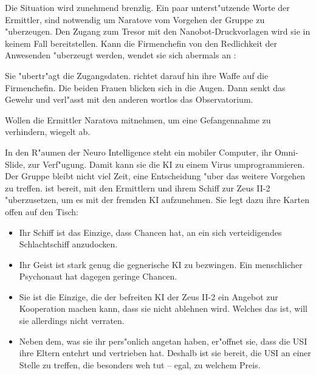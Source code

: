 
Die Situation wird zunehmend brenzlig. Ein paar unterst"utzende Worte der Ermittler, sind notwendig um Naratove vom Vorgehen der Gruppe zu "uberzeugen. Den Zugang zum Tresor mit den Nanobot-Druckvorlagen wird sie in keinem Fall bereitstellen. Kann die Firmenchefin von den Redlichkeit der Anwesenden "uberzeugt werden, wendet sie sich abermals an \ml{}:


Sie "ubertr"agt \ml{} die Zugangsdaten. \xl{} richtet darauf hin ihre Waffe auf die Firmenchefin. Die beiden Frauen blicken sich in die Augen. Dann senkt \xl{} das Gewehr und verl"asst mit den anderen wortlos das Observatorium.

Wollen die Ermittler Naratova mitnehmen, um eine Gefangennahme zu verhindern, wiegelt \xl{} ab. 


In den R"aumen der Neuro Intelligence steht \ml{} ein mobiler Computer, ihr Omni-Slide, zur Verf"ugung. Damit kann sie die KI zu einem Virus umprogrammieren. Der Gruppe bleibt nicht viel Zeit, eine Entscheidung "uber das weitere Vorgehen zu treffen. \xl{} ist bereit, mit den Ermittlern und ihrem Schiff zur Zeus II-2 "uberzusetzen, um es mit der fremden KI aufzunehmen. Sie legt dazu ihre Karten offen auf den Tisch:

\begin{itemize}
	\item Ihr Schiff ist das Einzige, dass Chancen hat, an ein sich verteidigendes Schlachtschiff anzudocken.
	\item Ihr Geist ist stark genug die gegnerische KI zu bezwingen. Ein menschlicher Psychonaut hat dagegen geringe Chancen.
	\item Sie ist die Einzige, die der befreiten KI der Zeus II-2 ein Angebot zur Kooperation machen kann, dass sie nicht ablehnen wird. 
		Welches das ist, will sie allerdings nicht verraten.
    \item Neben dem, was sie ihr pers"onlich angetan haben, er"offnet sie, dass die USI ihre Eltern entehrt und vertrieben hat. Deshalb ist sie bereit, die USI an einer Stelle zu treffen, die besonders weh tut -- egal, zu welchem Preis.
\end{itemize}


